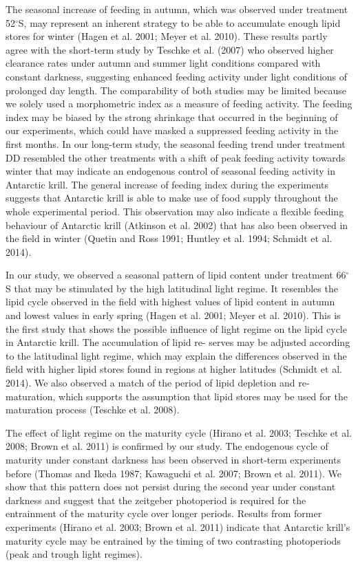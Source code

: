 The seasonal increase of feeding in autumn, which was observed under treatment
52$^{\circ}$S, may represent an inherent strategy to be able to accumulate
enough lipid stores for winter (Hagen et al. 2001; Meyer et al. 2010). These
results partly agree with the short-term study by Teschke et al. (2007) who
observed higher clearance rates under autumn and summer light conditions
compared with constant darkness, suggesting enhanced feeding activity under
light conditions of prolonged day length. The comparability of both studies may
be limited because we solely used a morphometric index as a measure of feeding
activity. The feeding index may be biased by the strong shrinkage that occurred
in the beginning of our experiments, which could have masked a suppressed
feeding activity in the first months. In our long-term study, the seasonal
feeding trend under treatment DD resembled the other treatments with a shift of
peak feeding activity towards winter that may indicate an endogenous control of
seasonal feeding activity in Antarctic krill. The general increase of feeding
index during the experiments suggests that Antarctic krill is able to make use
of food supply throughout the whole experimental period. This observation may
also indicate a flexible feeding behaviour of Antarctic krill (Atkinson et al.
2002) that has also been observed in the field in winter (Quetin and Ross 1991;
Huntley et al. 1994; Schmidt et al. 2014). 

In our study, we observed a seasonal pattern of lipid content under treatment
66$^{\circ}$S that may be stimulated by the high latitudinal light regime. It
resembles the lipid cycle observed in the field with highest values of lipid
content in autumn and lowest values in early spring (Hagen et al. 2001; Meyer
et al. 2010). This is the first study that shows the possible influence of
light regime on the lipid cycle in Antarctic krill. The accumulation of lipid
re- serves may be adjusted according to the latitudinal light regime, which may
explain the differences observed in the field with higher lipid stores found in
regions at higher latitudes (Schmidt et al. 2014). We also observed a match of
the period of lipid depletion and re-maturation, which supports the assumption
that lipid stores may be used for the maturation process (Teschke et al. 2008). 

The effect of light regime on the maturity cycle (Hirano et al. 2003; Teschke
et al. 2008; Brown et al. 2011) is confirmed by our study. The endogenous cycle
of maturity under constant darkness has been observed in short-term experiments
before (Thomas and Ikeda 1987; Kawaguchi et al. 2007; Brown et al. 2011). We
show that this pattern does not persist during the second year under constant
darkness and suggest that the zeitgeber photoperiod is required for the
entrainment of the maturity cycle over longer periods. Results from former
experiments (Hirano et al. 2003; Brown et al. 2011) indicate that Antarctic
krill’s maturity cycle may be entrained by the timing of two contrasting
photoperiods (peak and trough light regimes). 

